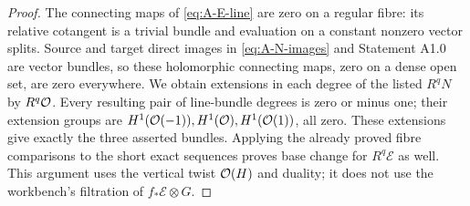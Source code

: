\begin{proof}
The connecting maps of \eqref{eq:A-E-line} are zero on a regular
fibre: its relative cotangent is a trivial bundle and evaluation on
a constant nonzero vector splits.  Source and target direct images
in \eqref{eq:A-N-images} and Statement A1.0 are vector bundles,
so these holomorphic connecting maps, zero on a dense open set, are
zero everywhere.  We obtain extensions in each degree of the listed
$R^qN$ by $R^q\mathcal O$.  Every resulting pair of line-bundle degrees is
zero or minus one; their extension groups are
$H^1(\mathcal O(-1)),H^1(\mathcal O),H^1(\mathcal O(1))$, all zero.  These extensions
give exactly the three asserted bundles.  Applying the already proved
fibre comparisons to the short exact sequences proves base change
for $R^q\mathcal E$ as well.  This argument uses the vertical twist
$\mathcal O(H)$ and duality; it does not use the workbench's filtration of
$f_*\mathcal E\otimes G$.
\end{proof}

